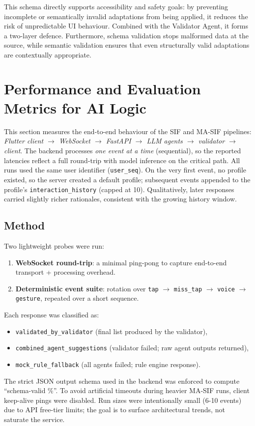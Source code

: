 This schema directly supports accessibility and safety goals: by preventing incomplete or semantically invalid adaptations from being applied, it reduces the risk of unpredictable UI behaviour. Combined with the Validator Agent, it forms a two-layer defence. Furthermore, schema validation stops malformed data at the source, while semantic validation ensures that even structurally valid adaptations are contextually appropriate.

\section{Performance and Evaluation Metrics for AI Logic}
\label{sec:perf-metrics-ai-logic}

This section measures the end-to-end behaviour of the SIF and MA\mbox{-}SIF pipelines:
\emph{Flutter client $\rightarrow$ WebSocket $\rightarrow$ FastAPI $\rightarrow$ LLM agents $\rightarrow$ validator $\rightarrow$ client}.
The backend processes \emph{one event at a time} (sequential), so the reported latencies reflect a full round-trip with model inference on the critical path.  
All runs used the same user identifier (\texttt{user\_seq}). On the very first event, no profile existed, so the server created a default profile; subsequent events appended to the profile’s \texttt{interaction\_history} (capped at 10). Qualitatively, later responses carried slightly richer rationales, consistent with the growing history window.

\subsection*{Method}
Two lightweight probes were run:
\begin{enumerate}
    \item \textbf{WebSocket round-trip}: a minimal ping-pong to capture end-to-end transport + processing overhead.
    \item \textbf{Deterministic event suite}: rotation over \texttt{tap} $\rightarrow$ \texttt{miss\_tap} $\rightarrow$ \texttt{voice} $\rightarrow$ \texttt{gesture}, repeated over a short sequence.
\end{enumerate}
Each response was classified as:
\begin{itemize}
    \item \texttt{validated\_by\_validator} (final list produced by the validator),
    \item \texttt{combined\_agent\_suggestions} (validator failed; raw agent outputs returned),
    \item \texttt{mock\_rule\_fallback} (all agents failed; rule engine response).
\end{itemize}
The strict JSON output schema used in the backend was enforced to compute “schema-valid \%”. To avoid artificial timeouts during heavier MA-SIF runs, client keep-alive pings were disabled. Run sizes were intentionally small (6-10 events) due to API free-tier limits; the goal is to surface architectural trends, not saturate the service.

